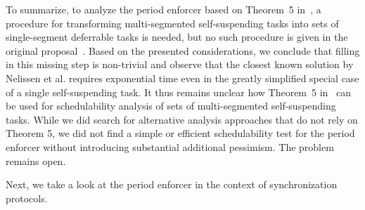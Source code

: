 To summarize, to analyze the period enforcer based on Theorem~5 in~\cite{Raj:suspension1991}, a procedure for transforming multi-segmented self-suspending tasks into sets of single-segment deferrable tasks is needed, but no such procedure is given in the original proposal~\cite{Raj:suspension1991}.
%
Based on the presented considerations, we conclude that filling in this missing step is non-trivial and observe that the closest known solution by Nelissen et al. \cite{ecrts15nelissen} requires exponential time even in the greatly simplified special case of a single self-suspending task. It thus remains unclear how Theorem~5 in~\cite{Raj:suspension1991} can be used for schedulability analysis of sets of multi-segmented self-suspending tasks. 
While we did search for alternative analysis approaches that do not rely on Theorem 5, we did not find a simple or efficient schedulability test for the period enforcer without introducing substantial additional pessimism.  The problem remains open. 

Next, we take a look at the period enforcer in the context of synchronization protocols.




